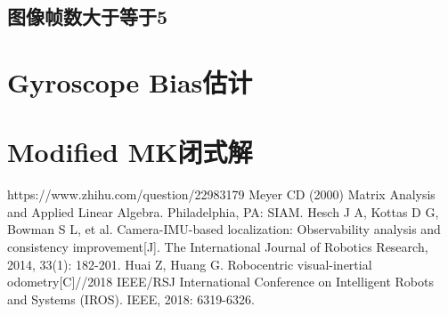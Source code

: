 \documentclass{article}
\begin{document}
\subsection{图像帧数大于等于5}

\section{Gyroscope Bias估计}

\section{Modified MK闭式解}


\begin{thebibliography}{99}  
    https://www.zhihu.com/question/22983179
    Meyer CD (2000) Matrix Analysis and Applied Linear Algebra. Philadelphia, PA: SIAM.
     Hesch J A, Kottas D G, Bowman S L, et al. Camera-IMU-based localization: Observability analysis and consistency improvement[J]. The International Journal of Robotics Research, 2014, 33(1): 182-201.
     Huai Z, Huang G. Robocentric visual-inertial odometry[C]//2018 IEEE/RSJ International Conference on Intelligent Robots and Systems (IROS). IEEE, 2018: 6319-6326.
\end{thebibliography}
\end{document}
